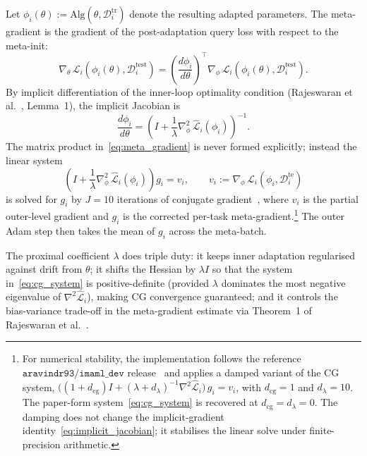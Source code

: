 \documentclass[10pt,journal,compsoc]{IEEEtran}
\begin{document}
Let $\phi_i(\theta) := \text{Alg}(\theta, \mathcal{D}^{\text{tr}}_i)$ denote the resulting adapted parameters. The
meta-gradient is the gradient of the post-adaptation query loss with
respect to the meta-init:
\begin{equation}\label{eq:meta_gradient}
\nabla_\theta\,\mathcal{L}_i(\phi_i(\theta), \mathcal{D}_i^{\text{test}})
=
\left(\frac{d\phi_i}{d\theta}\right)^{\!\top}
\nabla_\phi\,\mathcal{L}_i(\phi_i(\theta), \mathcal{D}_i^{\text{test}}).
\end{equation}
By implicit differentiation of the inner-loop optimality condition
(Rajeswaran et al.~\cite{rajeswaran2019}, Lemma~1), the implicit
Jacobian is
\begin{equation}\label{eq:implicit_jacobian}
\frac{d\phi_i}{d\theta}
=
\left(I + \frac{1}{\lambda}
   \nabla^2_\phi\,\hat{\mathcal{L}}_i(\phi_i)\right)^{-1}.
\end{equation}
The matrix product in~\eqref{eq:meta_gradient} is never formed
explicitly; instead the linear system
\begin{equation}\label{eq:cg_system}
\left(I + \frac{1}{\lambda}
   \nabla^2_\phi\,\hat{\mathcal{L}}_i(\phi_i)\right) g_i = v_i,
\qquad
v_i := \nabla_\phi\,\mathcal{L}_i(\phi_i, \mathcal{D}_i^{\text{te}})
\end{equation}
is solved for $g_i$ by $J = 10$ iterations of conjugate
gradient~\cite{hestenes1952}, where $v_i$ is the partial
outer-level gradient and $g_i$ is the corrected per-task
meta-gradient.\footnote{For numerical stability, the implementation
follows the reference $\texttt{aravindr93/imaml\_dev}$
release~\cite{rajeswaran2019} and applies a damped variant of the
CG system, $\bigl((1+d_{\text{cg}})I + (\lambda+d_\lambda)^{-1}
\nabla^2\hat{\mathcal{L}}_i\bigr)\,g_i = v_i$, with $d_{\text{cg}} = 1$
and $d_\lambda = 10$. The paper-form
system~\eqref{eq:cg_system} is recovered at $d_{\text{cg}} = d_\lambda
= 0$. The damping does not change the implicit-gradient
identity~\eqref{eq:implicit_jacobian}; it stabilises the linear solve
under finite-precision arithmetic.}
The outer Adam step then takes the mean of $g_i$ across the meta-batch.

The proximal coefficient $\lambda$ does triple duty: it keeps inner
adaptation regularised against drift from $\theta$; it shifts the
Hessian by $\lambda I$ so that the system in~\eqref{eq:cg_system} is
positive-definite (provided $\lambda$ dominates the most negative
eigenvalue of $\nabla^2 \hat{\mathcal{L}}_i$), making CG convergence
guaranteed; and it controls the bias-variance trade-off in the
meta-gradient estimate via Theorem~1 of
Rajeswaran et al.~\cite{rajeswaran2019}.
\end{document}
